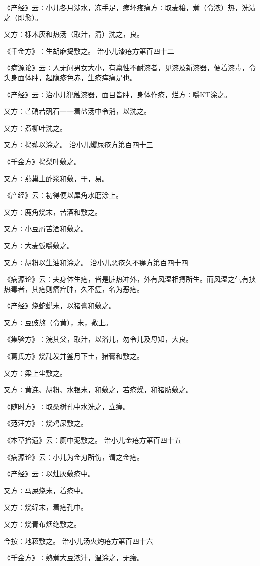 \documentclass[a4paper,12pt,UTF8,twoside]{ctexbook}
\begin{document}
《产经》云∶小儿冬月涉水，冻手足，瘃坏疼痛方∶取麦穣，煮（令浓）热，洗渍之（即愈）。

又方∶栎木灰和热汤（取汁，清）洗之，良。

《千金方》∶生胡麻捣敷之。
治小儿漆疮方第百四十二

《病源论》云∶人无问男女大小，有禀性不耐漆者，见漆及新漆器，便着漆毒，令头身面体肿，起隐疹色赤，生疮痒痛是也。

《产经》云∶治小儿犯触漆器，面目皆肿，身体作疮，烂方∶嚼KT涂之。

又方∶芒硝若矾石一一着盐汤中令消，以洗之。

又方∶煮柳叶洗之。

又方∶捣薤以涂之。
治小儿蠼尿疮方第百四十三

《千金方》捣梨叶敷之。

又方∶燕巢土酢浆和敷，干，易。

《产经》云∶初得便以犀角水磨涂上。

又方∶鹿角烧末，苦酒和敷之。

又方∶小豆屑苦酒和敷之。

又方∶大麦饭嚼敷之。

又方∶胡粉以生油和涂之。
治小儿恶疮久不瘥方第百四十四

《病源论》云∶夫身体生疮，皆是脏热冲外，外有风湿相搏所生。而风湿之气有挟热毒者，其疮则痛痒肿，久不瘥，名为恶疮。

《产经》烧蛇蜕末，以猪膏和敷之。

又方∶豆豉熬（令黄），末，敷上。

《集验方》∶浣其父，取汁，以浴儿，勿令儿及母知，大良。

《葛氏方》烧乱发并釜月下土，猪膏和敷之。

又方∶梁上尘敷之。

又方∶黄连、胡粉、水银末，和敷之，若疮燥，和猪肪敷之。

《随时方》∶取桑树孔中水洗之，立瘥。

《范汪方》∶烧鸡屎敷之。

《本草拾遗》云∶厕中泥敷之。
治小儿金疮方第百四十五

《病源论》云∶小儿为金刃所伤，谓之金疮。

《产经》云∶以灶灰敷疮中。

又方∶马屎烧末，着疮中。

又方∶烧绵末，着疮孔中。

又方∶烧青布烟绝敷之。

今按∶地菘敷之。
治小儿汤火灼疮方第百四十六

《千金方》∶熟煮大豆浓汁，温涂之，无瘢。
\end{document}
